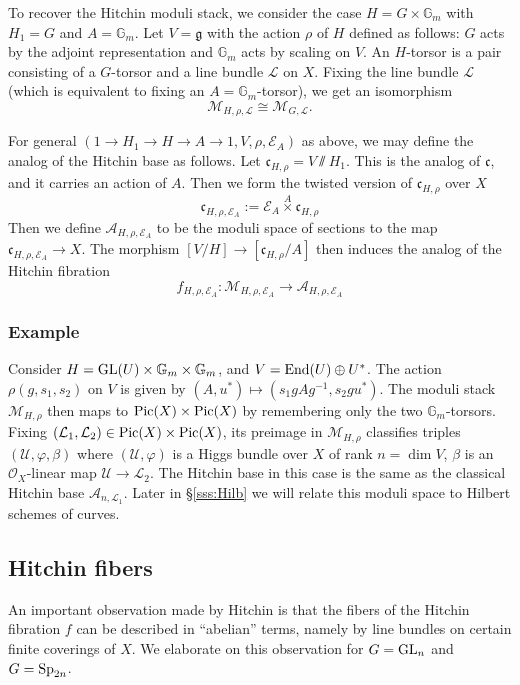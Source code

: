 \documentclass[]{pcmi}
\let\oldsubsubsection\subsubsection
\renewcommand{\subsubsection}[1]{%
\setcounter{subsubsection}{\value{equation}}%
\oldsubsubsection{#1}%
\refstepcounter{equation}%
}
\theoremstyle{plain}
\theoremstyle{definition}
\def\GG{\mathbb{G}}
\def\calA{\mathcal{A}}
\def\calE{\mathcal{E}}
\def\calL{\mathcal{L}}
\def\calM{\mathcal{M}}
\def\calO{\mathcal{O}}
\def\calU{\mathcal{U}}
\newcommand\frc{\mathfrak{c}}
\newcommand\frg{\mathfrak{g}}
\newcommand{\Pic}{\textup{Pic}}
\newcommand\End{\textup{End}}
\newcommand\GL{\textup{GL}}
\newcommand\Sp{\textup{Sp}}
\newcommand{\Gm}{\GG_m}
\newcommand{\twtimes}[1]{\stackrel{#1}{\times}}
\begin{document}
To recover the Hitchin moduli stack, we consider the case $H=G\times\Gm$ with $H_{1}=G$ and $A=\Gm$. Let $V=\frg$ with the action $\rho$ of $H$ defined as follows: $G$ acts by the adjoint representation and $\Gm$ acts by scaling on $V$. An $H$-torsor is a pair consisting of a $G$-torsor and a line bundle $\calL$ on $X$. Fixing the line bundle $\calL$ (which is equivalent to fixing an $A=\Gm$-torsor), we get an isomorphism
\begin{equation*}
\calM_{H,\rho, \calL}\cong\calM_{G, \calL}.
\end{equation*}

For general $(1\to H_{1}\to H\to A\to 1,V,\rho,\calE_{A})$ as above, we may define the analog of the Hitchin base as follows. Let $\frc_{H,\rho}=V\sslash H_{1}$. This is the analog of $\frc$, and it carries an action of $A$. Then we form the twisted version of $\frc_{H,\rho}$ over $X$
\begin{equation*}
\frc_{H,\rho,\calE_{A}}:=\calE_{A}\twtimes{A}\frc_{H,\rho}
\end{equation*}
Then we define $\calA_{H,\rho,\calE_{A}}$ to be the moduli space of sections to the map $\frc_{H,\rho,\calE_{A}}\to X$. The morphism $[V/H]\to [\frc_{H,\rho}/A]$ then induces the analog of the Hitchin fibration
\begin{equation*}
f_{H,\rho,\calE_{A}}: \calM_{H,\rho,\calE_{A}}\to \calA_{H,\rho,\calE_{A}}
\end{equation*}


\subsubsection{Example}\label{sss:MHilb} Consider $H=\GL(U)\times\Gm\times\Gm$, and $V=\End(U)\oplus U^{*}$. The action $\rho(g,s_{1}, s_{2})$ on $V$ is given by $(A,u^{*})\mapsto (s_{1}gAg^{-1}, s_{2}gu^{*})$. The moduli stack $\calM_{H,\rho}$ then maps to $\Pic(X)\times\Pic(X)$ by remembering only the two $\Gm$-torsors. Fixing $(\calL_{1},\calL_{2})\in \Pic(X)\times\Pic(X)$, its  preimage  in $\calM_{H,\rho}$ classifies triples $(\calU,\varphi,\beta)$ where $(\calU,\varphi)$ is a Higgs bundle over $X$ of rank $n=\dim V$, $\beta$ is an $\calO_{X}$-linear map $\calU\to \calL_{2}$. The Hitchin base in this case is the same as the classical Hitchin base $\calA_{n,\calL_{1}}$. Later in \S\ref{sss:Hilb} we will relate this moduli space to Hilbert schemes of curves.


\subsection{Hitchin fibers} An important observation made by Hitchin is that the fibers of the Hitchin fibration $f$ can be described in ``abelian'' terms, namely by line bundles on certain finite coverings of $X$. We elaborate on this observation for $G=\GL_{n}$ and $G=\Sp_{2n}$.
\end{document}

